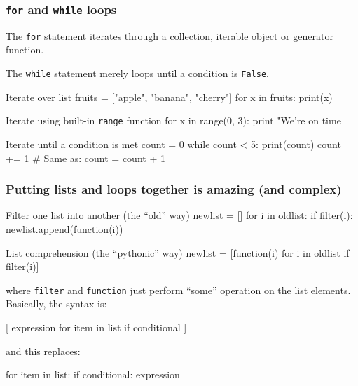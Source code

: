\documentclass[hyperref={colorlinks=true}]{beamer}
\begin{document}
\begin{frame}[fragile]
  \frametitle{\texttt{for} and \texttt{while} loops}

  The \texttt{for} statement iterates through a collection, iterable object or generator function.
  
  The \texttt{while} statement merely loops until a condition is \texttt{False}.

    \begin{ucpythonblock}{Iterate over list}
fruits = ["apple", "banana", "cherry"]
for x in fruits:
  print(x) 
    \end{ucpythonblock}

    \begin{ucpythonblock}{Iterate using built-in \texttt{range} function}
for x in range(0, 3):
  print "We're on time %
    \end{ucpythonblock}


    \begin{ucpythonblock}{Iterate until a condition is met}
count = 0
while count < 5:
  print(count)
  count += 1  # Same as: count = count + 1    
    \end{ucpythonblock}

\end{frame}


\begin{frame}[fragile]
  \frametitle{Putting lists and loops together is amazing (and complex)}

    \begin{ucpythonblock}{Filter one list into another (the ``old'' way)}
newlist = []
for i in oldlist:
    if filter(i):
        newlist.append(function(i))
    \end{ucpythonblock}

    \begin{ucpythonblock}{List comprehension (the ``pythonic'' way)}
newlist = [function(i) for i in oldlist if filter(i)]
    \end{ucpythonblock}

where \texttt{filter} and \texttt{function} just perform ``some'' operation on the list elements. Basically, the syntax is:
    \begin{ucpythonblock}{}
[ expression for item in list if conditional ] 
    \end{ucpythonblock}

and this replaces:
    \begin{ucpythonblock}{}
for item in list:
  if conditional:
    expression
    \end{ucpythonblock}


\end{frame}
\end{document}
